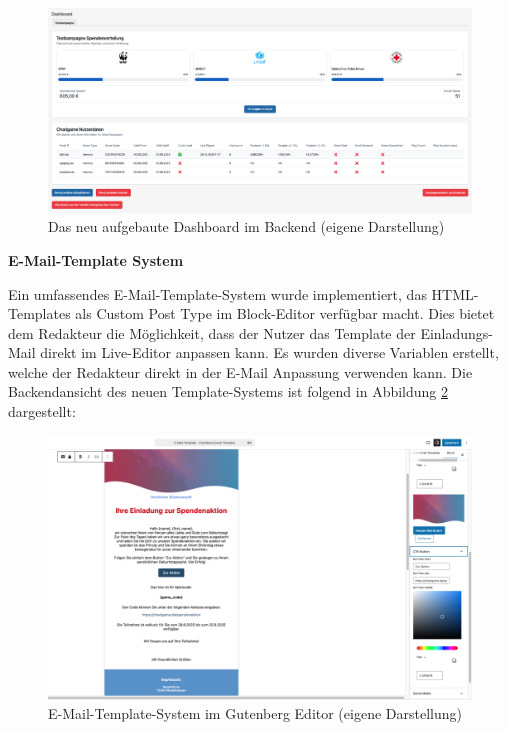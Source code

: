 \begin{figure}[H]
    \centering
    \includegraphics[width=1\textwidth]{images/new_dashboard_backend}
    \caption{Das neu aufgebaute Dashboard im Backend (eigene Darstellung)}
    \label{fig:new-dashboard-backend}
\end{figure}

\newpage
\textbf{E-Mail-Template System}

Ein umfassendes E-Mail-Template-System wurde implementiert, das HTML-Templates als Custom Post Type im Block-Editor verfügbar macht.
Dies bietet dem Redakteur die Möglichkeit, dass der Nutzer das Template der Einladungs-Mail direkt im Live-Editor anpassen kann.
Es wurden diverse Variablen erstellt, welche der Redakteur direkt in der E-Mail Anpassung verwenden kann.
Die Backendansicht des neuen Template-Systems ist folgend in Abbildung \ref{fig:new-email-backend} dargestellt:

\begin{figure}[H]
    \centering
    \includegraphics[width=1\textwidth]{images/new_email_backend}
    \caption{E-Mail-Template-System im Gutenberg Editor (eigene Darstellung)}
    \label{fig:new-email-backend}
\end{figure}

